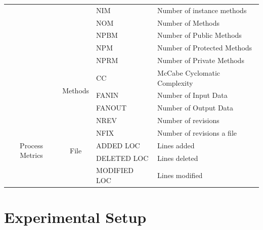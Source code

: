 \documentclass[sigconf]{acmart}
\theoremstyle{break}
\begin{document}
{\begin{table}[]
\begin{tabular}{|c|c|l|p{2cm}|}
                                  &                                   & NIM         & Number of instance methods     \\ \cline{3-4} 
                                  &                                   & NOM         & Number of Methods              \\ \cline{3-4} 
                                  &                                   & NPBM        & Number of Public Methods       \\ \cline{3-4} 
                                  &                                   & NPM         & Number of Protected Methods    \\ \cline{3-4} 
                                  &                                   & NPRM        & Number of Private Methods      \\ \cline{2-4} 
                                  & \multirow{3}{*}{Methods}          & CC          & McCabe Cyclomatic Complexity   \\ \cline{3-4} 
                                  &                                   & FANIN       & Number of Input Data           \\ \cline{3-4} 
                                  &                                   & FANOUT      & Number of Output Data          \\ \hline
\multirow{5}{*}{Process Metrics}  & \multirow{5}{*}{File}             & NREV        & Number of revisions            \\ \cline{3-4} 
                                  &                                   & NFIX        & Number of revisions a file     \\ \cline{3-4} 
                                  &                                   & ADDED LOC    & Lines added                    \\ \cline{3-4} 
                                  &                                   & DELETED LOC  & Lines deleted                  \\ \cline{3-4} 
                                  &                                   & MODIFIED LOC & Lines modified                 \\ \hline
\end{tabular}
\end{table}
}


\section{Experimental Setup}
\label{sec:Experimental}
\end{document}
